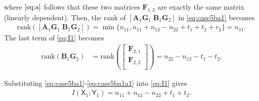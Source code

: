 \documentclass[12pt, draftclsnofoot, onecolumn]{IEEEtran}
\newcommand{\msf}[1]{\mathsf{#1}}
\theoremstyle{definition}
\begin{document}
where $\eqref{eq:a}$ follows that these two matrices $\boldsymbol{F}_{1,3}$ are exactly the same matrix (linearly dependent). Then, the rank of $[\boldsymbol{A}_1\boldsymbol{G}_1 \; \boldsymbol{B}_1\boldsymbol{G}_2]$ in \eqref{eq:case5ba1} becomes
\begin{align}
\text{rank}([\boldsymbol{A}_1\boldsymbol{G}_1 \; \boldsymbol{B}_1\boldsymbol{G}_2]) = \min\{n_{11},n_{11}+n_{12}-n_{22}+t_1+t_2+r_2\}=n_{11}.
\end{align}
The last term of \eqref{eq:I1} becomes
\begin{align}\label{eq:case5ba1a1}
\text{rank}(\boldsymbol{B}_1\boldsymbol{G}_2) &= \text{rank}\left(\begin{bmatrix}
\boldsymbol{F}_{2,1}\\
\boldsymbol{F}_{2,2}\\
\end{bmatrix}
\right) %
=n_{22}-n_{12}-t_1-t_2.
\end{align}


Substituting \eqref{eq:case5ba1}-\eqref{eq:case5ba1a1} into \eqref{eq:I1} gives
\begin{align}
I(\msf{X}_1;\msf{Y}_1) = n_{11}+n_{12}-n_{22}+t_1+t_2.
\end{align}
\end{document}
